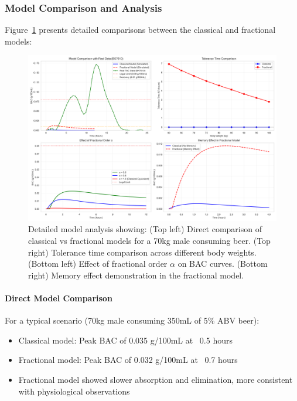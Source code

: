 \documentclass[12pt]{article}
\begin{document}
\subsubsection{Model Comparison and Analysis}

Figure~\ref{fig:model_analysis} presents detailed comparisons between the classical and fractional models:

\begin{figure}[H]
    \centering
    \includegraphics[width=\textwidth]{../model_analysis.png}
    \caption{Detailed model analysis showing: (Top left) Direct comparison of classical vs fractional models for a 70kg male consuming beer. (Top right) Tolerance time comparison across different body weights. (Bottom left) Effect of fractional order $\alpha$ on BAC curves. (Bottom right) Memory effect demonstration in the fractional model.}
    \label{fig:model_analysis}
\end{figure}

\paragraph{Direct Model Comparison}
For a typical scenario (70kg male consuming 350mL of 5\% ABV beer):
\begin{itemize}
    \item Classical model: Peak BAC of 0.035 g/100mL at ~0.5 hours
    \item Fractional model: Peak BAC of 0.032 g/100mL at ~0.7 hours
    \item Fractional model showed slower absorption and elimination, more consistent with physiological observations
\end{itemize}
\end{document}

